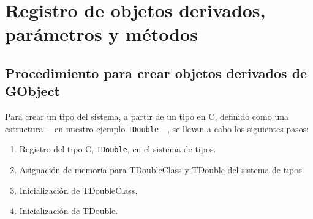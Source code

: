 %

\section{Registro de objetos derivados, parámetros y métodos}
\subsection{Procedimiento para crear objetos derivados de \textsf{GObject}}
Para crear un tipo del sistema, a partir de un tipo en C, definido como una estructura ---en nuestro
ejemplo \texttt{TDouble}---, se llevan a cabo los siguientes pasos:
\begin{enumerate}
  \tightlist
\item Registro del tipo C, \texttt{TDouble}, en el sistema de tipos.
\item Asignación de memoria para \textsf{TDoubleClass} y \textsf{TDouble} del sistema de tipos.
\item Inicialización de \textsf{TDoubleClass}.
\item Inicialización de \textsf{TDouble}.
\end{enumerate}

